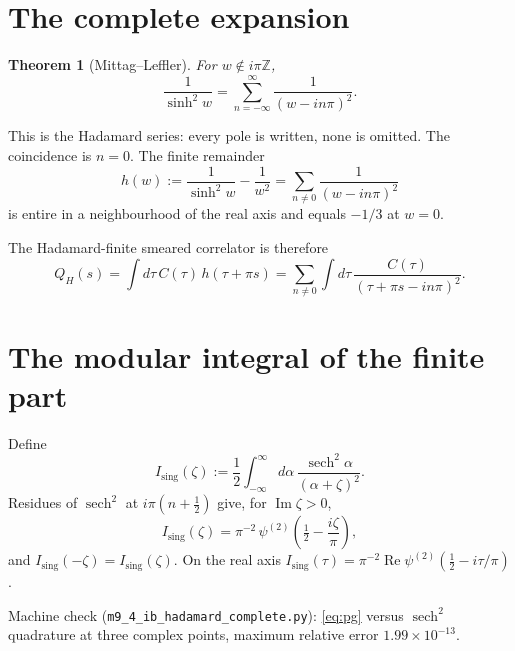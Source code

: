 \documentclass[11pt]{article}
\newtheorem{theorem}{Theorem}[section]
\theoremstyle{definition}
\newcommand{\sech}{\operatorname{sech}}
\begin{document}
\section{The complete expansion}

\begin{theorem}[Mittag--Leffler]
For $w\notin i\pi\mathbb{Z}$,
\begin{equation}
\frac{1}{\sinh^{2}w}
=
\sum_{n=-\infty}^{\infty}\frac{1}{(w-in\pi)^{2}}.
\label{eq:ML}
\end{equation}
\end{theorem}

This is the Hadamard series: every pole is written, none is omitted.
The coincidence is $n=0$. The finite remainder
\begin{equation}
h(w)
:=
\frac{1}{\sinh^{2}w}-\frac{1}{w^{2}}
=
\sum_{n\neq 0}\frac{1}{(w-in\pi)^{2}}
\label{eq:h}
\end{equation}
is entire in a neighbourhood of the real axis and equals $-1/3$ at
$w=0$.

The Hadamard-finite smeared correlator is therefore
\begin{equation}
Q_{H}(s)
=
\int d\tau\,C(\tau)\,h(\tau+\pi s)
=
\sum_{n\neq 0}\int d\tau\,\frac{C(\tau)}{(\tau+\pi s-in\pi)^{2}}.
\label{eq:QH}
\end{equation}

\section{The modular integral of the finite part}

Define
\begin{equation}
I_{\mathrm{sing}}(\zeta)
:=
\frac12\int_{-\infty}^{\infty}d\alpha\,
\frac{\sech^{2}\alpha}{(\alpha+\zeta)^{2}}.
\label{eq:Ising}
\end{equation}
Residues of $\sech^{2}$ at $i\pi(n+\tfrac12)$ give, for
$\operatorname{Im}\zeta>0$,
\begin{equation}
I_{\mathrm{sing}}(\zeta)
=
\pi^{-2}\,\psi^{(2)}\!\left(\tfrac12-\frac{i\zeta}{\pi}\right),
\label{eq:pg}
\end{equation}
and $I_{\mathrm{sing}}(-\zeta)=I_{\mathrm{sing}}(\zeta)$. On the real
axis
$I_{\mathrm{sing}}(\tau)=\pi^{-2}\operatorname{Re}\psi^{(2)}(\tfrac12-i\tau/\pi)$.

Machine check (\texttt{m9\_4\_ib\_hadamard\_complete.py}):
\eqref{eq:pg} versus $\sech^{2}$ quadrature at three complex points,
maximum relative error $1.99\times 10^{-13}$.
\end{document}
